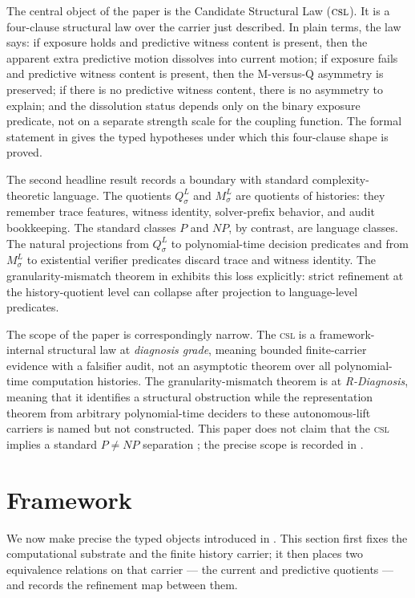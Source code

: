 \documentclass[11pt]{article}
\newcommand{\CSL}{\textsc{csl}}            \newcommand{\CSLcore}{Candidate Structural Law}
\newcommand{\Substrate}{\sigma}             \newcommand{\Lift}{L}                       \newcommand{\LiftState}{\sigma_{L}}         \newcommand{\HistorySpace}{H_{\Substrate}^{\Lift}}
\newcommand{\Qquotient}{Q_{\Substrate}^{\Lift}}
\newcommand{\Mquotient}{M_{\Substrate}^{\Lift}}
\newcommand{\DiagnosisGrade}{\emph{diagnosis grade}}
\newcommand{\RDiagnosis}{\emph{R-Diagnosis}}
\theoremstyle{definition}
\begin{document}
The central object of the paper is the \CSLcore{} (\(\CSL\)).  It is a
four-clause structural law over the carrier just described.  In plain
terms, the law says: if exposure holds and predictive witness content
is present, then the apparent extra predictive motion dissolves into
current motion; if exposure fails and predictive witness content is
present, then the M-versus-Q asymmetry is preserved; if there is no
predictive witness content, there is no asymmetry to explain; and the
dissolution status depends only on the binary exposure predicate, not
on a separate strength scale for the coupling function.  The formal
statement in  gives the typed hypotheses under
which this four-clause shape is proved.

The second headline result records a boundary with standard
complexity-theoretic language.  The quotients \(\Qquotient\) and
\(\Mquotient\) are quotients of histories: they remember trace
features, witness identity, solver-prefix behavior, and audit
bookkeeping.  The standard classes \(P\) and \(NP\), by contrast, are
language classes.  The natural projections from \(\Qquotient\) to
polynomial-time decision predicates and from \(\Mquotient\) to
existential verifier predicates discard trace and witness identity.
The granularity-mismatch theorem in
 exhibits this loss explicitly: strict
refinement at the history-quotient level can collapse after projection
to language-level predicates.

The scope of the paper is correspondingly narrow.  The \CSL{} is a
framework-internal structural law at \DiagnosisGrade{}, meaning
bounded finite-carrier evidence with a falsifier audit, not an
asymptotic theorem over all polynomial-time computation histories.  The
granularity-mismatch theorem is at \RDiagnosis{}, meaning that it
identifies a structural obstruction while the representation theorem
from arbitrary polynomial-time deciders to these autonomous-lift
carriers is named but not constructed.  This paper does not claim that
the \CSL{} implies a standard \(P\neq NP\) separation
\citep{Cook2000PNPClay,Aaronson2016PNP}; the precise scope is recorded
in .
 

\section{Framework}
\label{sec:framework}

We now make precise the typed objects introduced in
.  This section first fixes the computational
substrate and the finite history carrier; it then places two
equivalence relations on that carrier --- the current and predictive
quotients --- and records the refinement map between them.
\end{document}
